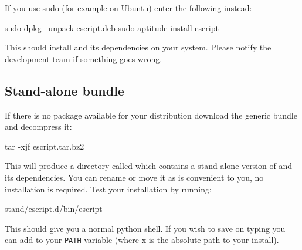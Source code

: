 If you use sudo (for example on Ubuntu) enter the following instead:
\begin{shellCode}
sudo dpkg --unpack escript.deb
sudo aptitude install escript
\end{shellCode}

This should install \esfinley and its dependencies on your system.
Please notify the development team if something goes wrong.


\subsection{Stand-alone bundle}\label{sec:standalonelinux}

If there is no package available for your distribution download the generic \linux bundle and decompress it:
\begin{shellCode}
tar -xjf escript.tar.bz2 
\end{shellCode}
This will produce a directory called  which contains a stand-alone version of \esfinley and its dependencies.
You can rename or move it as is convenient to you, no installation is required.
Test your installation by running:
\begin{shellCode}
stand/escript.d/bin/escript
\end{shellCode}
This should give you a normal python shell.
If you wish to save on typing you can add  to your \texttt{PATH} variable (where x is the absolute path to your install).

